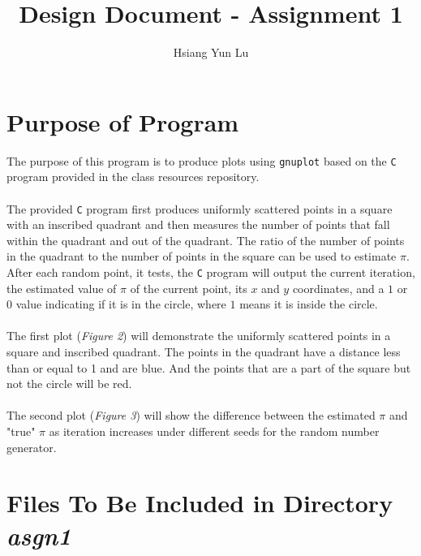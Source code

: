 \documentclass[12pt]{article}
\title{Design Document - Assignment 1}
\author{Hsiang Yun Lu}
\begin{document}
\maketitle

\section{Purpose of Program}

The purpose of this program is to produce plots using \texttt{gnuplot} 
based on the \texttt{C} program provided in the class resources repository. \\
\\
The provided \texttt{C} program first produces uniformly scattered points in a square with an inscribed quadrant and then measures the number of points that fall within the quadrant and out of the quadrant. The ratio of the number of points in the quadrant to the number of points in the square can be used to estimate $\pi$. After each random point, it tests, the \texttt{C} program will output the current iteration, the estimated value of $\pi$ of the current point, its $x$ and $y$ coordinates, and a $1$ or $0$ value indicating if it is in the circle, where $1$ means it is inside the circle. \\
\\
The first plot (\textit{Figure 2}) will demonstrate the uniformly scattered points in a square and inscribed quadrant. The points in the quadrant have a distance less than or equal to 1 and are blue. And the points that are a part of the square but not the circle will be red. \\
\\
The second plot (\textit{Figure 3}) will show the difference between the estimated $\pi$ and "true" $\pi$ as iteration increases under different seeds for the random number generator. \\

\section{Files To Be Included in Directory \textit{asgn1}}
\end{document}
